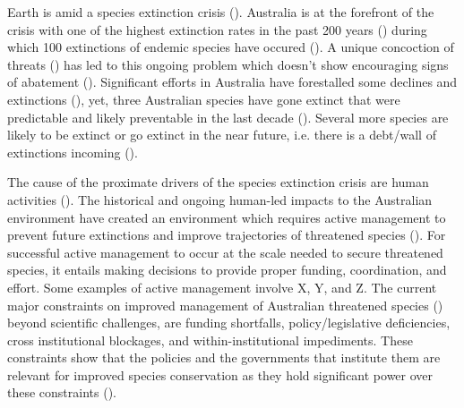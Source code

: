 \documentclass[a4paper,11pt]{article}
\begin{document}
Earth is amid a species extinction crisis (\cite{ceballosAcceleratedModernHuman2015,lewisDefiningAnthropocene2015,ipbesSummaryPolicymakersGlobal2019}). Australia is at the forefront of the crisis with one of the highest extinction rates in the past 200 years (\cite{woinarskiOngoingUnravelingContinental2015}) during which 100 extinctions of endemic species have occured (\cite{woinarskiReadingBlackBook2019, commonwealthofaustraliaSpeciesProfileThreats2021}). A unique concoction of threats (\cite{kearneyThreatsAustraliaImperilled2019}) has led to this ongoing problem which doesn't show encouraging signs of abatement (\cite{simmondsVulnerableSpeciesEcosystems2020,wardLotsLossLittle2019,resideHowSendFinch2019}). Significant efforts in Australia have forestalled some declines and extinctions (\cite{kearneyThreatsAustraliaImperilled2019}), yet, three Australian species have gone extinct that were predictable and likely preventable in the last decade (\cite{woinarskiContributionPolicyLaw2017}). Several more species are likely to be extinct or go extinct in the near future, i.e. there is a debt/wall of extinctions incoming (\cite{woinarskiOngoingUnravelingContinental2015}).

The cause of the proximate drivers of the species extinction crisis are human activities (\cite{sternerPolicyDesignAnthropocene2019, maxwellBiodiversityRavagesGuns2016,brookSynergiesExtinctionDrivers2008}). The historical and ongoing human-led impacts to the Australian environment have created an environment which requires active management to prevent future extinctions and improve trajectories of threatened species (\cite{kearneyThreatsAustraliaImperilled2019, allekThreatsEndangeringAustralia2018}). For successful active management to occur at the scale needed to secure threatened species, it entails making decisions to provide proper funding, coordination, and effort. Some examples of active management involve X, Y, and Z. The current major constraints on improved management of Australian threatened species (\cite{leggeMonitoringThreatenedSpecies2018, wintleSpendingWhatWill2019, simmondsVulnerableSpeciesEcosystems2020,kearneyThreatsAustraliaImperilled2019,woinarskiReadingBlackBook2019,wardLotsLossLittle2019}) beyond scientific challenges, are funding shortfalls, policy/legislative deficiencies, cross institutional blockages, and within-institutional impediments. These constraints show that the policies and the governments that institute them are relevant for improved species conservation as they hold significant power over these constraints (\cite{rydenLinkingDemocracyBiodiversity2020}).
\end{document}
